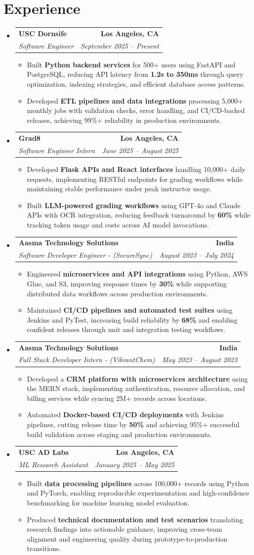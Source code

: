 \documentclass[letterpaper,10pt]{article}
\makeatletter
\newcommand{\resumeItem}[1]{\item\small{{#1 \vspace{-2pt}}}}
\newcommand{\resumeSubheading}[4]{\vspace{-1pt}\item\begin{tabular*}{1.0\textwidth}[t]{l@{\extracolsep{\fill}}r}\textbf{#1} & \textbf{\small #2} \\\textit{\small#3} & \textit{\small #4} \\\end{tabular*}\vspace{-2pt}}
\newcommand{\resumeSubHeadingListStart}{\begin{itemize}[leftmargin=0.0in, label={}]}
\newcommand{\resumeSubHeadingListEnd}{\end{itemize}}
\newcommand{\resumeItemListStart}{\begin{itemize}[leftmargin=0.15in,label=\textbullet,itemsep=2pt,topsep=0pt,parsep=0pt,partopsep=0pt]}
\newcommand{\resumeItemListEnd}{\end{itemize}\vspace{-4pt}}
\makeatother
\begin{document}
\section{Experience}
\resumeSubHeadingListStart
\resumeSubheading{USC Dornsife}{Los Angeles, CA}{Software Engineer}{September 2025 -- Present}
\resumeItemListStart
\resumeItem{Built \textbf{Python backend services} for 500+ users using FastAPI and PostgreSQL, reducing API latency from \textbf{1.2s to 350ms} through query optimization, indexing strategies, and efficient database access patterns.}
\resumeItem{Developed \textbf{ETL pipelines and data integrations} processing 5,000+ monthly jobs with validation checks, error handling, and CI/CD-backed releases, achieving 99\%+ reliability in production environments.}
\resumeItemListEnd
\resumeSubheading{Grad8}{Los Angeles, CA}{Software Engineer Intern}{June 2025 -- August 2025}
\resumeItemListStart
\resumeItem{Developed \textbf{Flask APIs and React interfaces} handling 10,000+ daily requests, implementing RESTful endpoints for grading workflows while maintaining stable performance under peak instructor usage.}
\resumeItem{Built \textbf{LLM-powered grading workflows} using GPT-4o and Claude APIs with OCR integration, reducing feedback turnaround by \textbf{60\%} while tracking token usage and costs across AI model invocations.}
\resumeItemListEnd
\resumeSubheading{Aasma Technology Solutions}{India}{Software Developer Engineer - (SecureSync)}{August 2023 -- July 2024}
\resumeItemListStart
\resumeItem{Engineered \textbf{microservices and API integrations} using Python, AWS Glue, and S3, improving response times by \textbf{30\%} while supporting distributed data workflows across production environments.}
\resumeItem{Maintained \textbf{CI/CD pipelines and automated test suites} using Jenkins and PyTest, increasing build reliability by \textbf{68\%} and enabling confident releases through unit and integration testing workflows.}
\resumeItemListEnd
\resumeSubheading{Aasma Technology Solutions}{India}{Full Stack Developer Intern - (VibrantChem)}{May 2023 -- August 2023}
\resumeItemListStart
\resumeItem{Developed a \textbf{CRM platform with microservices architecture} using the MERN stack, implementing authentication, resource allocation, and billing services while syncing 2M+ records across locations.}
\resumeItem{Automated \textbf{Docker-based CI/CD deployments} with Jenkins pipelines, cutting release time by \textbf{50\%} and achieving 95\%+ successful build validation across staging and production environments.}
\resumeItemListEnd
\resumeSubheading{USC AD Labs}{Los Angeles, CA}{ML Research Assistant}{January 2025 -- May 2025}
\resumeItemListStart
\resumeItem{Built \textbf{data processing pipelines} across 100,000+ records using Python and PyTorch, enabling reproducible experimentation and high-confidence benchmarking for machine learning model evaluation.}
\resumeItem{Produced \textbf{technical documentation and test scenarios} translating research findings into actionable guidance, improving cross-team alignment and engineering quality during prototype-to-production transitions.}
\resumeItemListEnd
\resumeSubHeadingListEnd
\vspace{-14pt}
\end{document}
